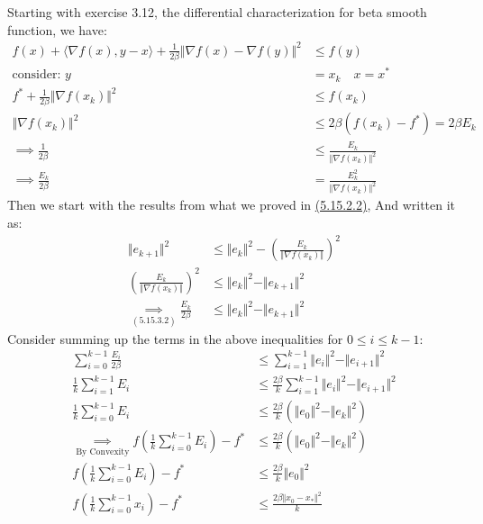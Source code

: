 \documentclass[]{article}
\begin{document}
    Starting with exercise 3.12, the differential characterization for beta smooth function, we have: 
    \begin{align*}\tag{5.15.3.2}\label{eqn:5.15.3.2}
        f(x) + \langle \nabla f(x), y -x\rangle 
        + 
        \frac{1}{2\beta} \Vert \nabla f(x) - \nabla f(y)\Vert^2
        &
        \le f(y)
        \\
        \text{consider: } y&= x_k \quad x = x^* 
        \\
        f^* + \frac{1}{2\beta} \Vert \nabla f(x_k)\Vert^2 &\le f(x_k)
        \\
        \Vert \nabla f(x_k)\Vert^2 &\le 
        2\beta(f(x_k) - f^*) = 2 \beta E_k
        \\
        \implies
        \frac{1}{2\beta} &\le \frac{E_k}{\Vert \nabla f(x_k)\Vert^2}
        \\
        \implies 
        \frac{E_k}{2\beta} &= \frac{E_k^2}{\Vert \nabla f(x_k)\Vert^2}
    \end{align*}
    Then we start with the results from what we proved in \hyperref[eqn:5.15.2.2]{(5.15.2.2)}, And written it as: 
        \begin{align*}\tag{5.15.3.3}\label{eqn:5.15.3.3}
            \Vert e_{k + 1}\Vert^2 
            & \le 
            \Vert e_k\Vert^2 - 
            \left(
                \frac{E_k}{\Vert \nabla f(x_k)\Vert}
            \right)^2
            \\
            \left(
                \frac{E_k}{\Vert \nabla f(x_k)\Vert} 
            \right)^2 &\le 
            \Vert e_{k}\Vert^2 - \Vert e_{k + 1}\Vert^2
            \\\underset{
                \hyperref[eqn:5.15.3.2]{(5.15.3.2)}
            }
            {\implies}
            \frac{E_k}{2\beta}
            &\le 
            \Vert e_{k}\Vert^2 - \Vert e_{k + 1}\Vert^2
        \end{align*}
    Consider summing up the terms in the above inequalities for $0 \le i \le k - 1$:
    \begin{align*}\tag{5.15.3.4}\label{eqn:5.15.3.4}
        \sum_{i = 0}^{k - 1}\frac{E_i}{2\beta}
        & \le 
        \sum_{i = 1}^{k - 1} \Vert e_i\Vert^2 - \Vert e_{i + 1}\Vert^2
        \\
        \frac{1}{k} \sum_{i = 1}^{k - 1}E_i &\le 
        \frac{2\beta}{k} \sum_{i = 1}^{k - 1}\Vert e_i\Vert^2 - \Vert e_{i + 1}\Vert^2
        \\
        \frac{1}{k}\sum_{i = 0}^{k - 1} E_i & \le 
        \frac{2\beta}{k}\left(
            \Vert e_0\Vert^2 - \Vert e_k\Vert^2
        \right)
        \\
        \underset{\text{By Convexity}}{\implies}
        f\left(
            \frac{1}{k}\sum_{i = 0}^{k - 1}E_i 
        \right)- f^*
        &\le
        \frac{2\beta}{k}\left(
            \Vert e_0\Vert^2 - \Vert e_k\Vert^2
        \right) 
        \\
        f\left(
            \frac{1}{k}\sum_{i = 0}^{k - 1}E_i 
        \right)- f^*
        &\le 
        \frac{2\beta}{k}\Vert e_0\Vert^2
        \\
        f\left(
            \frac{1}{k} \sum_{i = 0}^{k - 1}x_i  
        \right) - f^* &\le \frac{2\beta \Vert x_0 - x_*\Vert^2}{k}
    \end{align*} 
\end{document}
